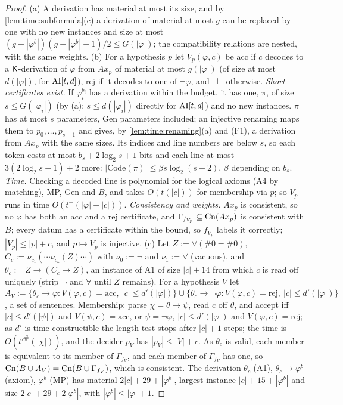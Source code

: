 \begin{proof}
(a) A derivation has material at most its size, and by \cref{lem:time:subformula}(c) a derivation of material at most $g$ can be replaced by one with no new instances and size at most $(g+|\varphi^b|)(g+|\varphi^b|+1)/2\le G(|\varphi|)$; the compatibility relations are nested, with the same weights.
(b) For a hypothesis $p$ let $V_p(\varphi,c)$ be acc if $c$ decodes to a $\mathsf{K}$-derivation of $\varphi$ from $Ax_p$ of material at most $g(|\varphi|)$ (of size at most $d(|\varphi|)$, for $\mathrm{AI}[t,d]$), rej if it decodes to one of $\neg\varphi$, and $\perp$ otherwise. \emph{Short certificates exist.} If $\varphi_i^{b_i}$ has a derivation within the budget, it has one, $\pi$, of size $s\le G(|\varphi_i|)$ (by (a); $s\le d(|\varphi_i|)$ directly for $\mathrm{AI}[t,d]$) and no new instances. $\pi$ has at most $s$ parameters, Gen parameters included; an injective renaming maps them to $p_0,\dots,p_{s-1}$ and gives, by \cref{lem:time:renaming}(a) and (F1), a derivation from $Ax_p$ with the same sizes. Its indices and line numbers are below $s$, so each token costs at most $b_s+2\log_2s+1$ bits and each line at most $3(2\log_2s+1)+2$ more: $|\mathrm{Code}(\pi)|\le\beta s\log_2(s+2)$, $\beta$ depending on $b_s$. \emph{Time.} Checking a decoded line is polynomial for the logical axioms (A4 by matching), MP, Gen and $B$, and takes $O(t(|c|))$ for membership via $p$; so $V_p$ runs in time $O(t^+(|\varphi|+|c|))$. \emph{Consistency and weights.} $Ax_p$ is consistent, so no $\varphi$ has both an acc and a rej certificate, and $\Gamma_{f_{V_p}}\subseteq\mathrm{Cn}(Ax_p)$ is consistent with $B$; every datum has a certificate within the bound, so $f_{V_p}$ labels it correctly; $|V_p|\le|p|+c$, and $p\mapsto V_p$ is injective.
(c) Let $Z:=\forall(\#0=\#0)$, $C_c:=\nu_{c_1}(\cdots\nu_{c_k}(Z)\cdots)$ with $\nu_0:=\neg$ and $\nu_1:=\forall$ (vacuous), and $\theta_c:=Z\to(C_c\to Z)$, an instance of A1 of size $|c|+14$ from which $c$ is read off uniquely (strip $\neg$ and $\forall$ until $Z$ remains). For a hypothesis $V$ let $A_V:=\{\theta_c\to\varphi:V(\varphi,c)=\mathrm{acc},\ |c|\le d'(|\varphi|)\}\cup\{\theta_c\to\neg\varphi:V(\varphi,c)=\mathrm{rej},\ |c|\le d'(|\varphi|)\}$, a set of sentences. Membership: parse $\chi=\theta\to\psi$, read $c$ off $\theta$, and accept iff $|c|\le d'(|\psi|)$ and $V(\psi,c)=\mathrm{acc}$, or $\psi=\neg\varphi$, $|c|\le d'(|\varphi|)$ and $V(\varphi,c)=\mathrm{rej}$; as $d'$ is time-constructible the length test stops after $|c|+1$ steps; the time is $O(t'^\#(|\chi|))$, and the decider $p_V$ has $|p_V|\le|V|+c$. As $\theta_c$ is valid, each member is equivalent to its member of $\Gamma_{f_V}$, and each member of $\Gamma_{f_V}$ has one, so $\mathrm{Cn}(B\cup A_V)=\mathrm{Cn}(B\cup\Gamma_{f_V})$, which is consistent. The derivation $\theta_c$ (A1), $\theta_c\to\varphi^b$ (axiom), $\varphi^b$ (MP) has material $2|c|+29+|\varphi^b|$, largest instance $|c|+15+|\varphi^b|$ and size $2|c|+29+2|\varphi^b|$, with $|\varphi^b|\le|\varphi|+1$.
\end{proof}

